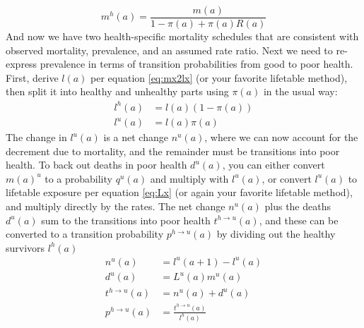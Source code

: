 \documentclass[sn-apa]{sn-jnl}%
\theoremstyle{thmstyleone}%
\theoremstyle{thmstyletwo}%
\theoremstyle{thmstylethree}%
\begin{document}
\begin{equation}
\label{eq:mha}
m^h(a) = \frac{m(a)}{1-\pi(a) + \pi(a)R(a)}
\end{equation}
And now we have two health-specific mortality schedules that are consistent with observed mortality, prevalence, and an assumed rate ratio. Next we need to re-express prevalence in terms of transition probabilities from good to poor health. First, derive $l(a)$ per equation \eqref{eq:mx2lx} (or your favorite lifetable method), then split it into healthy and unhealthy parts using $\pi(a)$ in the usual way:
\begin{equation}
\begin{aligned}
l^h(a) &= l(a) (1-\pi(a))\\
l^u(a) &= l(a) \pi(a)
\end{aligned}
\end{equation}
The change in $l^u(a)$ is a net change $n^u(a)$, where we can now account for the decrement due to mortality, and the remainder must be transitions into poor health. To back out deaths in poor health $d^u(a)$, you can either convert $m(a)^u$ to a probability $q^u(a)$ and multiply with $l^u(a)$, or convert $l^u(a)$ to lifetable exposure per equation \eqref{eq:Lx} (or again your favorite lifetable method), and multiply directly by the rates. The net change $n^u(a)$ plus the deaths $d^u(a)$ sum to the transitions into poor health $t^{h\rightarrow u}(a)$, and these can be converted to a transition probability $p^{h\rightarrow u}(a)$ by dividing out the healthy survivors $l^h(a)$
\begin{equation}
\label{eq:onset}
\begin{aligned}
n^u(a) &= l^u(a+1) - l^u(a)\\
d^u(a) &= L^u(a) m^u(a)\\
t^{h\rightarrow u}(a) &= n^u(a) + d^u(a)\\
p^{h\rightarrow u}(a) &= \frac{t^{h\rightarrow u}(a) }{l^h(a)}
\end{aligned}
\end{equation}
\end{document}
